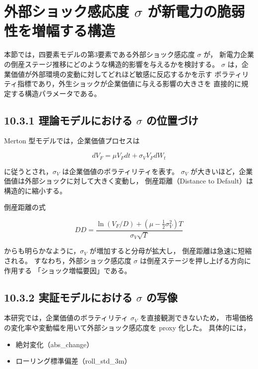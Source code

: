 \section{外部ショック感応度 $\sigma$ が新電力の脆弱性を増幅する構造}

本節では，四要素モデルの第3要素である外部ショック感応度 $\sigma$ が，
新電力企業の倒産ステージ推移にどのような構造的影響を与えるかを検討する。
$\sigma$ は，企業価値が外部環境の変動に対してどれほど敏感に反応するかを示す
ボラティリティ指標であり，外生ショックが企業価値に与える影響の大きさを
直接的に規定する構造パラメータである。

\subsection*{10.3.1 理論モデルにおける $\sigma$ の位置づけ}

Merton 型モデルでは，企業価値プロセスは



\[
dV_F = \mu V_F dt + \sigma_V V_F dW_t
\]



に従うとされ，$\sigma_V$ は企業価値のボラティリティを表す。
$\sigma_V$ が大きいほど，企業価値は外部ショックに対して大きく変動し，
倒産距離（Distance to Default）は構造的に縮小する。

倒産距離の式



\[
DD = \frac{\ln(V_F/D) + (\mu - \frac{1}{2}\sigma_V^2)T}{\sigma_V\sqrt{T}}
\]



からも明らかなように，$\sigma_V$ が増加すると分母が拡大し，
倒産距離は急速に短縮される。
すなわち，外部ショック感応度 $\sigma$ は倒産ステージを押し上げる方向に作用する
「ショック増幅要因」である。

\subsection*{10.3.2 実証モデルにおける $\sigma$ の写像}

本研究では，企業価値のボラティリティ $\sigma_V$ を直接観測できないため，
市場価格の変化率や変動幅を用いて外部ショック感応度を proxy 化した。
具体的には，

\begin{itemize}
    \item 絶対変化（abs\_change）
    \item ローリング標準偏差（roll\_std\_3m）
\end{itemize}

